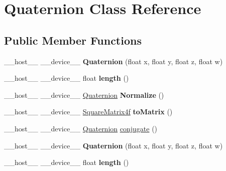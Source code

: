 \hypertarget{class_quaternion}{}\section{Quaternion Class Reference}
\label{class_quaternion}
\subsection*{Public Member Functions}
\begin{DoxyCompactItemize}
\item 
\+\_\+\+\_\+host\+\_\+\+\_\+ \+\_\+\+\_\+device\+\_\+\+\_\+ {\bfseries Quaternion} (float x, float y, float z, float w)\hypertarget{class_quaternion_a1a4bd86f9d61fd86784c4c0242706f71}{}\label{class_quaternion_a1a4bd86f9d61fd86784c4c0242706f71}

\item 
\+\_\+\+\_\+host\+\_\+\+\_\+ \+\_\+\+\_\+device\+\_\+\+\_\+ float {\bfseries length} ()\hypertarget{class_quaternion_a78a3e8c21812d2311790df5152e3c139}{}\label{class_quaternion_a78a3e8c21812d2311790df5152e3c139}

\item 
\+\_\+\+\_\+host\+\_\+\+\_\+ \+\_\+\+\_\+device\+\_\+\+\_\+ \hyperlink{class_quaternion}{Quaternion} {\bfseries Normalize} ()\hypertarget{class_quaternion_a90a71b875a7bc6e705e829805e748184}{}\label{class_quaternion_a90a71b875a7bc6e705e829805e748184}

\item 
\+\_\+\+\_\+host\+\_\+\+\_\+ \+\_\+\+\_\+device\+\_\+\+\_\+ \hyperlink{class_square_matrix4}{Square\+Matrix4f} {\bfseries to\+Matrix} ()\hypertarget{class_quaternion_a5474d0118b84350ddbd163bdd7ff1e60}{}\label{class_quaternion_a5474d0118b84350ddbd163bdd7ff1e60}

\item 
\+\_\+\+\_\+host\+\_\+\+\_\+ \+\_\+\+\_\+device\+\_\+\+\_\+ \hyperlink{class_quaternion}{Quaternion} \hyperlink{class_quaternion_aee895e4a7d8f3d0e8a65d9ddea5b24b5}{conjugate} ()
\item 
\+\_\+\+\_\+host\+\_\+\+\_\+ \+\_\+\+\_\+device\+\_\+\+\_\+ {\bfseries Quaternion} (float x, float y, float z, float w)\hypertarget{class_quaternion_a1a4bd86f9d61fd86784c4c0242706f71}{}\label{class_quaternion_a1a4bd86f9d61fd86784c4c0242706f71}

\item 
\+\_\+\+\_\+host\+\_\+\+\_\+ \+\_\+\+\_\+device\+\_\+\+\_\+ float {\bfseries length} ()\hypertarget{class_quaternion_a78a3e8c21812d2311790df5152e3c139}{}\label{class_quaternion_a78a3e8c21812d2311790df5152e3c139}


\end{DoxyCompactItemize}
